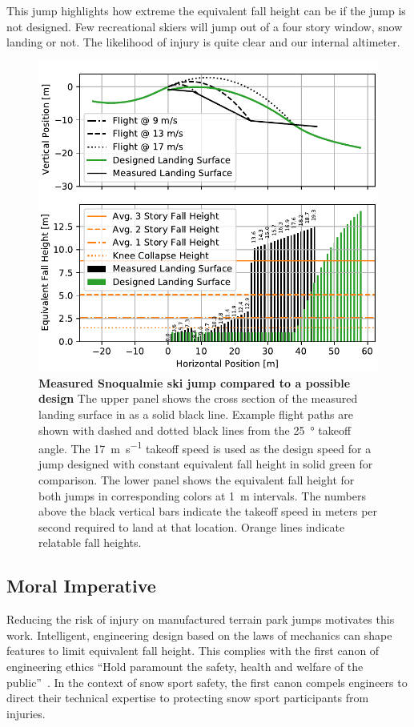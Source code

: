 \documentclass{article}
\begin{document}
This jump highlights how extreme the equivalent fall height can be if the jump
is not designed. Few recreational skiers will jump out of a four story window,
snow landing or not. The likelihood of injury is quite clear and our internal
altimeter.
%
\begin{figure}
  \centering
  \includegraphics[width=5.25in]{figures/salvini-v-snoqualmie.pdf}
  \caption{\textbf{Measured Snoqualmie ski jump compared to a possible design}
  The upper panel shows the cross section of the measured landing surface in as
  a solid black line. Example flight paths are shown with dashed and dotted
  black lines from the 25~\si{\degree} takeoff angle. The
  17~\si{\meter\per\second} takeoff speed is used as the design speed for a
  jump designed with constant equivalent fall height in solid green for
  comparison. The lower panel shows the equivalent fall height for both jumps
  in corresponding colors at 1~\si{\meter} intervals. The numbers above the
  black vertical bars indicate the takeoff speed in meters per second required
  to land at that location. Orange lines indicate relatable fall heights.}
  \label{fig:salvini-v-snoqualmie}
\end{figure}


\subsection{Moral Imperative}
%
Reducing the risk of injury on manufactured terrain park jumps motivates this
work. Intelligent, engineering design based on the laws of mechanics can shape
features to limit equivalent fall height. This complies with the first canon of
engineering ethics ``Hold paramount the safety, health and welfare of the
public''~\cite{NSPE2019}. In the context of snow sport safety, the first canon
compels engineers to direct their technical expertise to protecting snow sport
participants from injuries.
\end{document}
